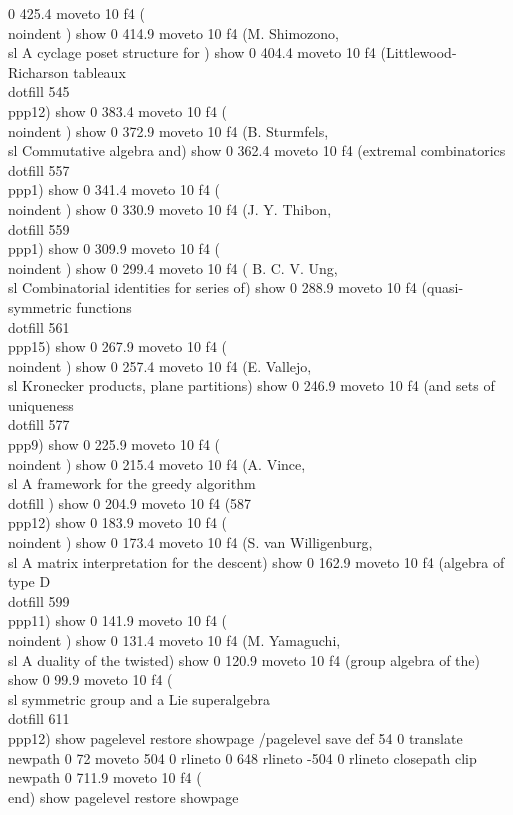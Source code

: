 0 425.4 moveto
10 f4
(\\noindent     ) show
0 414.9 moveto
10 f4
(M. Shimozono,  {\\sl A cyclage poset structure for ) show
0 404.4 moveto
10 f4
(Littlewood-Richarson tableaux}\\dotfill   545\\ppp{12}) show
0 383.4 moveto
10 f4
(\\noindent     ) show
0 372.9 moveto
10 f4
(B. Sturmfels,  {\\sl Commutative algebra and) show
0 362.4 moveto
10 f4
(extremal combinatorics}\\dotfill   557\\ppp{1}) show
0 341.4 moveto
10 f4
(\\noindent     ) show
0 330.9 moveto
10 f4
(J. Y. Thibon,\\dotfill 559\\ppp{1}) show
0 309.9 moveto
10 f4
(\\noindent    ) show
0 299.4 moveto
10 f4
( B. C. V. Ung,   {\\sl Combinatorial identities for series of) show
0 288.9 moveto
10 f4
(quasi-symmetric functions}\\dotfill   561\\ppp{15}) show
0 267.9 moveto
10 f4
(\\noindent     ) show
0 257.4 moveto
10 f4
(E. Vallejo,  {\\sl Kronecker products, plane partitions) show
0 246.9 moveto
10 f4
(and sets of uniqueness}\\dotfill   577\\ppp{9}) show
0 225.9 moveto
10 f4
(\\noindent     ) show
0 215.4 moveto
10 f4
(A. Vince,  {\\sl A framework for the greedy algorithm}\\dotfill  ) show
0 204.9 moveto
10 f4
(587\\ppp{12}) show
0 183.9 moveto
10 f4
(\\noindent     ) show
0 173.4 moveto
10 f4
(S. van Willigenburg,   {\\sl A matrix interpretation for the descent) show
0 162.9 moveto
10 f4
(algebra of type D}\\dotfill   599\\ppp{11}) show
0 141.9 moveto
10 f4
(\\noindent     ) show
0 131.4 moveto
10 f4
(M. Yamaguchi,  {\\sl A duality of the twisted) show
0 120.9 moveto
10 f4
(group algebra of the}) show
0 99.9 moveto
10 f4
({\\sl symmetric group and a Lie superalgebra}\\dotfill   611\\ppp{12}) show
pagelevel restore
showpage
/pagelevel save def
54 0 translate
newpath 0 72 moveto 504 0 rlineto 0 648 rlineto -504 0 rlineto  closepath clip newpath
0 711.9 moveto
10 f4
(\\end) show
pagelevel restore
showpage

